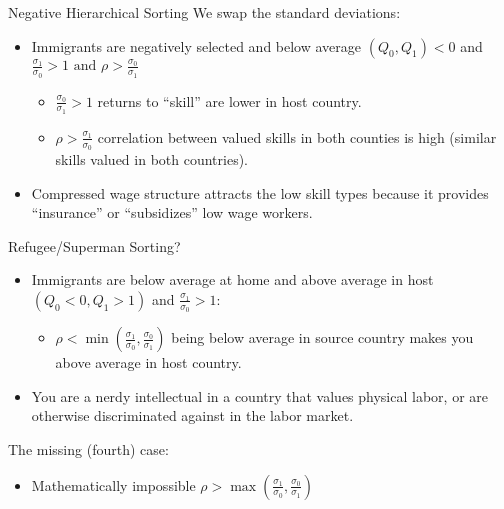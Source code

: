 \documentclass[xcolor=pdftex,dvipsnames,table,mathserif,aspectratio=169]{beamer}
\begin{document}
\begin{frame}{Negative Hierarchical Sorting}
We swap the standard deviations:
\begin{itemize}
\item Immigrants are negatively selected and below average $(Q_0,Q_1) < 0$ and $\frac{\sigma_{1}}{\sigma_{0}}>1 \text { and } \rho>\frac{\sigma_{0}}{\sigma_{1}}$
\begin{itemize}
\item $\frac{\sigma_{0}}{\sigma_{1}}>1$ returns to ``skill'' are lower in host country.
\item $\rho>\frac{\sigma_{1}}{\sigma_{0}}$ correlation between valued skills in both counties is high (similar skills valued in both countries).
\end{itemize}
\item Compressed wage structure attracts the low skill types because it provides ``insurance'' or ``subsidizes'' low wage workers.
\end{itemize}
\end{frame}

\begin{frame}{Refugee/Superman Sorting?}
\begin{itemize}
\item Immigrants are below average at home and above average in host $(Q_0<0 ,Q_1>1)$ and $\frac{\sigma_{1}}{\sigma_{0}}>1$:
\begin{itemize}
\item $\rho<\min \left(\frac{\sigma_{1}}{\sigma_{0}}, \frac{\sigma_{0}}{\sigma_{1}}\right)$ being below average in source country makes you above average in host country.
\end{itemize}
\item You are a nerdy intellectual in a country that values physical labor, or are otherwise discriminated against in the labor market.
\end{itemize}
The missing (fourth) case:
\begin{itemize}
\item Mathematically impossible $\rho>\max \left(\frac{\sigma_{1}}{\sigma_{0}}, \frac{\sigma_{0}}{\sigma_{1}}\right)$
\end{itemize}
\end{frame}
\end{document}
